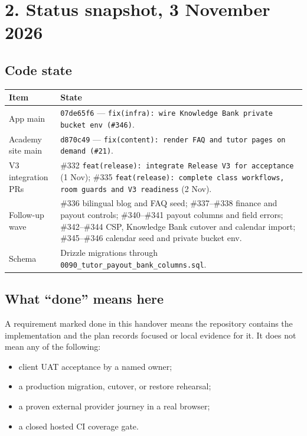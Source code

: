\documentclass[11pt,a4paper]{article}
\newcommand{\code}[1]{\texttt{#1}}
\begin{document}
\section{2. Status snapshot, 3 November 2026}

\subsection{Code state}

\begin{tabular}{@{}L{4.2cm}L{11.4cm}@{}}
\toprule
\textbf{Item} & \textbf{State} \\
\midrule
App main & \code{07de65f6} --- \code{fix(infra): wire Knowledge Bank private bucket env (\#346)}. \\
Academy site main & \code{d870c49} --- \code{fix(content): render FAQ and tutor pages on demand (\#21)}. \\
V3 integration PRs & \#332 \code{feat(release): integrate Release V3 for acceptance} (1 Nov); \#335 \code{feat(release): complete class workflows, room guards and V3 readiness} (2 Nov). \\
Follow-up wave & \#336 bilingual blog and FAQ seed; \#337--\#338 finance and payout controls; \#340--\#341 payout columns and field errors; \#342--\#344 CSP, Knowledge Bank cutover and calendar import; \#345--\#346 calendar seed and private bucket env. \\
Schema & Drizzle migrations through \code{0090\_tutor\_payout\_bank\_columns.sql}. \\
\bottomrule
\end{tabular}

\subsection{What ``done'' means here}

A requirement marked done in this handover means the repository contains the implementation and the plan records focused or local evidence for it. It does not mean any of the following:

\begin{itemize}
	\item client UAT acceptance by a named owner;
	\item a production migration, cutover, or restore rehearsal;
	\item a proven external provider journey in a real browser;
	\item a closed hosted CI coverage gate.
\end{itemize}
\end{document}
